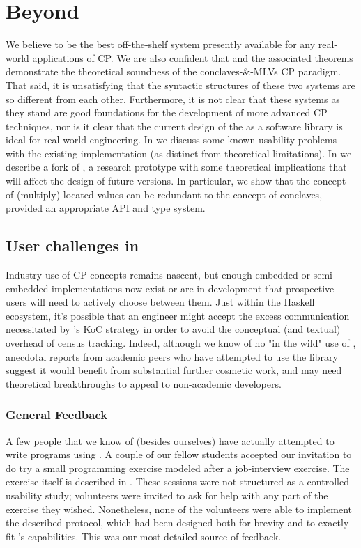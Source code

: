 \chapter{Beyond \MultiChor}
\label{sec:future}

We believe \MultiChor to be the best off-the-shelf system presently available for any real-world applications of CP.
We are also confident that \HLSCentral and the associated theorems demonstrate the theoretical soundness of the conclaves-\&-MLVs
CP paradigm.
That said, it is unsatisfying that the syntactic structures of these two systems are so different from each other.
Furthermore, it is not clear that these systems as they stand are good foundations for the development of more advanced CP techniques,
nor is it clear that the current design of the \MultiChor as a software library is ideal for real-world engineering.
In  we discuss some known usability problems with the existing \MultiChor implementation
(as distinct from theoretical limitations).
In  we describe a fork of \MultiChor, a research prototype with some theoretical implications that will affect
the design of future \MultiChor versions.
In particular, we show that the concept of (multiply) located values can be redundant to the concept of conclaves,
provided an appropriate API and type system.

\section{User challenges in \MultiChor}
\label{sec:usability}

Industry use of CP concepts remains nascent,
but enough embedded or semi-embedded implementations now exist or are in development that prospective users
will need to actively choose between them.
Just within the Haskell ecosystem, it's possible that an engineer might accept the excess communication necessitated by \HasChor's
KoC strategy in order to avoid the conceptual (and textual) overhead of census tracking.
Indeed, although we know of no "in the wild" use of \MultiChor,
anecdotal reports from academic peers who have attempted to use the library suggest it would benefit from substantial further cosmetic work,
and may need theoretical breakthroughs to appeal to non-academic developers.

\subsection{General Feedback}
\label{sec:usability-sources}
A few people that we know of (besides ourselves) have actually attempted to write programs using \MultiChor.
A couple of our fellow students accepted our invitation to do try a small programming exercise modeled after a job-interview exercise.
The exercise itself is described in .
These sessions were not structured as a controlled usability study;
volunteers were invited to ask for help with any part of the exercise they wished.
Nonetheless, none of the volunteers were able to implement the described protocol,
which had been designed both for brevity and to exactly fit \MultiChor's capabilities.
This was our most detailed source of feedback.

